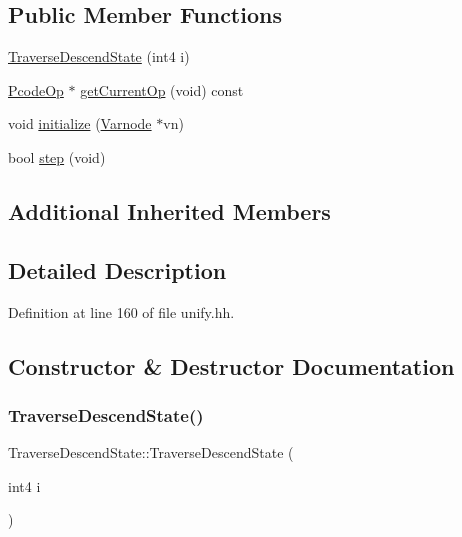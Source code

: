 \subsection*{Public Member Functions}
\begin{DoxyCompactItemize}
\item 
\mbox{\hyperlink{class_traverse_descend_state_acfa7016c48d00112f679dbc27b20a279}{Traverse\+Descend\+State}} (int4 i)
\item 
\mbox{\hyperlink{class_pcode_op}{Pcode\+Op}} $\ast$ \mbox{\hyperlink{class_traverse_descend_state_aad49b6319f29521faf5e70a38175aa5d}{get\+Current\+Op}} (void) const
\item 
void \mbox{\hyperlink{class_traverse_descend_state_abff13d38a3804c7199e1aee25003b010}{initialize}} (\mbox{\hyperlink{class_varnode}{Varnode}} $\ast$vn)
\item 
bool \mbox{\hyperlink{class_traverse_descend_state_ab99061b4d55c4a27bd920ca6a08fa051}{step}} (void)
\end{DoxyCompactItemize}
\subsection*{Additional Inherited Members}


\subsection{Detailed Description}


Definition at line 160 of file unify.\+hh.



\subsection{Constructor \& Destructor Documentation}
\mbox{\label{class_traverse_descend_state_acfa7016c48d00112f679dbc27b20a279}} 
\subsubsection{\texorpdfstring{TraverseDescendState()}{TraverseDescendState()}}
{\footnotesize\ttfamily Traverse\+Descend\+State\+::\+Traverse\+Descend\+State (\begin{DoxyParamCaption}\item[{int4}]{i }\end{DoxyParamCaption})\hspace{0.3cm}{\ttfamily [inline]}}



